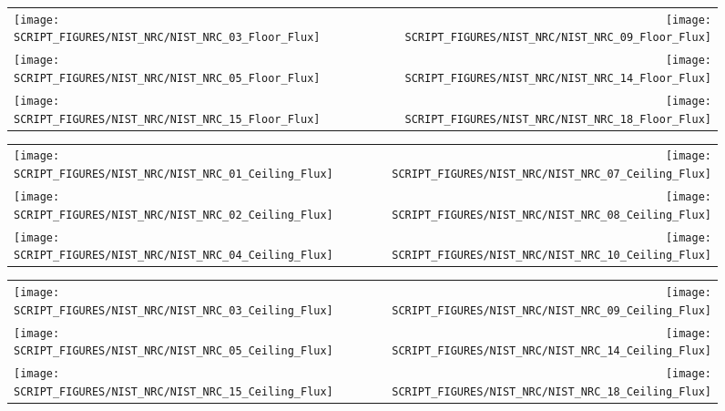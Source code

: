 \begin{figure}[p]
\begin{tabular*}{\textwidth}{l@{\extracolsep{\fill}}r}
\texttt{[image: SCRIPT\_FIGURES/NIST\_NRC/NIST\_NRC\_03\_Floor\_Flux]} &
\texttt{[image: SCRIPT\_FIGURES/NIST\_NRC/NIST\_NRC\_09\_Floor\_Flux]} \\
\texttt{[image: SCRIPT\_FIGURES/NIST\_NRC/NIST\_NRC\_05\_Floor\_Flux]} &
\texttt{[image: SCRIPT\_FIGURES/NIST\_NRC/NIST\_NRC\_14\_Floor\_Flux]} \\
\texttt{[image: SCRIPT\_FIGURES/NIST\_NRC/NIST\_NRC\_15\_Floor\_Flux]} &
\texttt{[image: SCRIPT\_FIGURES/NIST\_NRC/NIST\_NRC\_18\_Floor\_Flux]}
\end{tabular*}
\label{NIST_NRC_Floor_Flux_Open}
\end{figure}


\begin{figure}[p]
\begin{tabular*}{\textwidth}{l@{\extracolsep{\fill}}r}
\texttt{[image: SCRIPT\_FIGURES/NIST\_NRC/NIST\_NRC\_01\_Ceiling\_Flux]} &
\texttt{[image: SCRIPT\_FIGURES/NIST\_NRC/NIST\_NRC\_07\_Ceiling\_Flux]} \\
\texttt{[image: SCRIPT\_FIGURES/NIST\_NRC/NIST\_NRC\_02\_Ceiling\_Flux]} &
\texttt{[image: SCRIPT\_FIGURES/NIST\_NRC/NIST\_NRC\_08\_Ceiling\_Flux]} \\
\texttt{[image: SCRIPT\_FIGURES/NIST\_NRC/NIST\_NRC\_04\_Ceiling\_Flux]} &
\texttt{[image: SCRIPT\_FIGURES/NIST\_NRC/NIST\_NRC\_10\_Ceiling\_Flux]}
\end{tabular*}
\label{NIST_NRC_Ceiling_Flux_Closed}
\end{figure}

\begin{figure}[p]
\begin{tabular*}{\textwidth}{l@{\extracolsep{\fill}}r}
\texttt{[image: SCRIPT\_FIGURES/NIST\_NRC/NIST\_NRC\_03\_Ceiling\_Flux]} &
\texttt{[image: SCRIPT\_FIGURES/NIST\_NRC/NIST\_NRC\_09\_Ceiling\_Flux]} \\
\texttt{[image: SCRIPT\_FIGURES/NIST\_NRC/NIST\_NRC\_05\_Ceiling\_Flux]} &
\texttt{[image: SCRIPT\_FIGURES/NIST\_NRC/NIST\_NRC\_14\_Ceiling\_Flux]} \\
\texttt{[image: SCRIPT\_FIGURES/NIST\_NRC/NIST\_NRC\_15\_Ceiling\_Flux]} &
\texttt{[image: SCRIPT\_FIGURES/NIST\_NRC/NIST\_NRC\_18\_Ceiling\_Flux]}
\end{tabular*}
\label{NIST_NRC_Ceiling_Flux_Open}
\end{figure}

\clearpage

